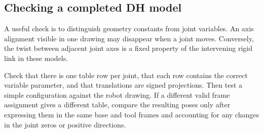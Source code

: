 \subsection{Checking a completed DH model}
A useful check is to distinguish geometry constants from joint variables.
An axis alignment visible in one drawing may disappear when a joint
moves. Conversely, the twist between adjacent joint axes is a fixed
property of the intervening rigid link in these models.

Check that there is one table row per joint, that each row contains the
correct variable parameter, and that translations are signed projections.
Then test a simple configuration against the robot drawing. If a different
valid frame assignment gives a different table, compare the resulting
poses only after expressing them in the same base and tool frames and
accounting for any changes in the joint zeros or positive directions.
